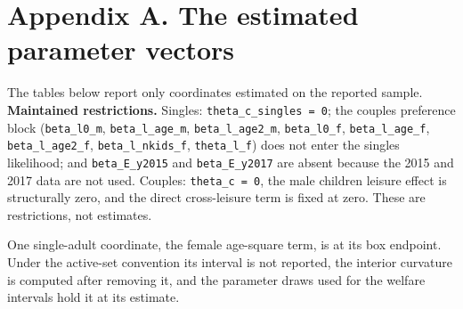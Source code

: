 \section{Appendix A. The estimated parameter vectors}\label{appendix-a.-the-estimated-parameter-vectors}

The tables below report only coordinates estimated on the reported sample. \textbf{Maintained restrictions.} Singles: \texttt{theta\_c\_singles\ =\ 0}; the couples preference block (\texttt{beta\_l0\_m}, \texttt{beta\_l\_age\_m}, \texttt{beta\_l\_age2\_m}, \texttt{beta\_l0\_f}, \texttt{beta\_l\_age\_f}, \texttt{beta\_l\_age2\_f}, \texttt{beta\_l\_nkids\_f}, \texttt{theta\_l\_f}) does not enter the singles likelihood; and \texttt{beta\_E\_y2015} and \texttt{beta\_E\_y2017} are absent because the 2015 and 2017 data are not used. Couples: \texttt{theta\_c\ =\ 0}, the male children leisure effect is structurally zero, and the direct cross-leisure term is fixed at zero. These are restrictions, not estimates.

One single-adult coordinate, the female age-square term, is at its box endpoint. Under the active-set convention its interval is not reported, the interior curvature is computed after removing it, and the parameter draws used for the welfare intervals hold it at its estimate.

